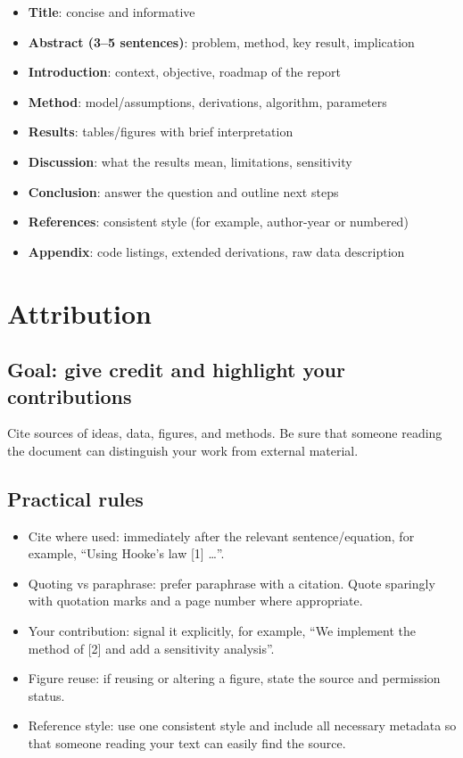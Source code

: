 \documentclass[
  a4paper,
  DIV=11,
  numbers=noendperiod,
  oneside]{scrreprt}
\providecommand{\tightlist}{%
  \setlength{\itemsep}{0pt}\setlength{\parskip}{0pt}}
\begin{document}
\begin{itemize}
\tightlist
\item
  \textbf{Title}: concise and informative
\item
  \textbf{Abstract (3--5 sentences)}: problem, method, key result,
  implication
\item
  \textbf{Introduction}: context, objective, roadmap of the report
\item
  \textbf{Method}: model/assumptions, derivations, algorithm, parameters
\item
  \textbf{Results}: tables/figures with brief interpretation
\item
  \textbf{Discussion}: what the results mean, limitations, sensitivity
\item
  \textbf{Conclusion}: answer the question and outline next steps
\item
  \textbf{References}: consistent style (for example, author-year or
  numbered)
\item
  \textbf{Appendix}: code listings, extended derivations, raw data
  description
\end{itemize}

\section{Attribution}\label{sec-writing-attribution}

\subsection{Goal: give credit and highlight your
contributions}\label{goal-give-credit-and-highlight-your-contributions}

Cite sources of ideas, data, figures, and methods. Be sure that someone
reading the document can distinguish your work from external material.

\subsection{Practical rules}\label{practical-rules}

\begin{itemize}
\tightlist
\item
  Cite where used: immediately after the relevant sentence/equation, for
  example, ``Using Hooke's law {[}1{]} \ldots{}''.
\item
  Quoting vs paraphrase: prefer paraphrase with a citation. Quote
  sparingly with quotation marks and a page number where appropriate.
\item
  Your contribution: signal it explicitly, for example, ``We implement
  the method of {[}2{]} and add a sensitivity analysis''.
\item
  Figure reuse: if reusing or altering a figure, state the source and
  permission status.
\item
  Reference style: use one consistent style and include all necessary
  metadata so that someone reading your text can easily find the source.
\end{itemize}
\end{document}
